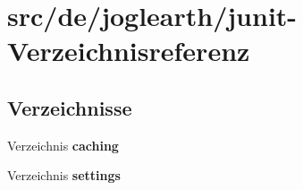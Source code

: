 \section{src/de/joglearth/junit-\/\-Verzeichnisreferenz}
\label{dir_9d3fa7a8f098672eb55738123adbb164}
\subsection*{Verzeichnisse}
\begin{DoxyCompactItemize}
\item 
Verzeichnis {\bf caching}
\item 
Verzeichnis {\bf settings}
\end{DoxyCompactItemize}
